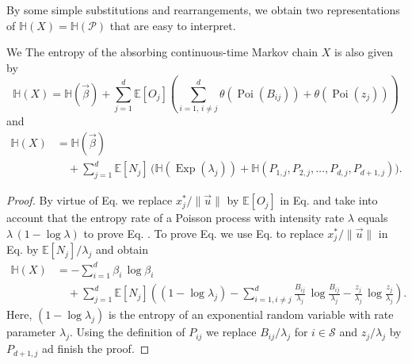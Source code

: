 \documentclass[smallextended]{svjour3}
\makeatletter
\renewcommand*{\eqref}[1]{%
  \hyperref[{#1}]{\textup{\tagform@{\ref*{#1}}}}%
}
\newcommand{\E}{\mathbb{E}}
\renewcommand{\H}{\mathbb{H}}
\newcommand{\Exp}{\operatorname{Exp}}
\newcommand{\Poi}{\operatorname{Poi}}
\newcommand{\suml}{\sum\limits}
\newcommand{\vnorms}[1]{\|#1\|}
\makeatother
\begin{document}
By some simple substitutions and rearrangements, we obtain two representations of $\H(X)=\H(\mathcal{P})$ that are easy to interpret.

\begin{proposition}\label{prop:entropy_of_X}
	We
	The entropy of the absorbing continuous-time Markov chain $X$ is also given by
	\begin{equation}
	  \label{eqn:H_occupation_time}
	  \H(X) = \H(\vec{\beta}) + \suml_{j=1}^d \E\left[O_j\right] \left(\suml_{i=1,\,i\neq j}^d \theta(\Poi(B_{ij})) + \theta(\Poi(z_j))\right)
	\end{equation}
	and
	\begin{equation}
	  \label{eqn:H_number_of_visits}
	  \begin{aligned}
      \H(X)& = \H(\vec{\beta})\\
      &\quad + \suml_{j=1}^d \E\left[N_j\right]\, \bigg(\H(\Exp(\lambda_j)) + \H(P_{1,j}, P_{2, j},\ldots,P_{d, j}, P_{d+1,j})\bigg).
    \end{aligned}
  \end{equation}
\end{proposition}

\begin{proof}
  By virtue of Eq. \eqref{eqn:H_occupation_time} we replace $x^\ast_j/\vnorms{\vec{u}}$ by $\E\left[O_j\right]$ in Eq. \eqref{eqn:H_X} and take into account that the entropy rate of a Poisson process with intensity rate $\lambda$ equals $\lambda\,(1-\log \lambda)$ to prove Eq. \eqref{eqn:H_occupation_time}.
  To prove Eq. \eqref{eqn:H_number_of_visits} we use Eq. \eqref{eqn:N_i} to replace $x^\ast_j/\vnorms{\vec{u}}$ in Eq. \eqref{eqn:H_X} by $\E\left[N_j\right]/\lambda_j$ and obtain
  \begin{equation*}
    \begin{aligned}
      \H(X) &= -\suml_{i=1}^d\beta_i\,\log\beta_i\\
      &\quad + \suml_{j=1}^d \E\left[N_j\right]\left((1-\log \lambda_j) - \suml_{i=1,i\neq j}^d \frac{B_{ij}}{\lambda_j}\,\log \frac{B_{ij}}{\lambda_j} - \frac{z_j}{\lambda_j}\,\log \frac{z_j}{\lambda_j}\right).
    \end{aligned}
	\end{equation*}
	Here, $(1-\log \lambda_j)$ is the entropy of an exponential random variable with rate parameter $\lambda_j$.
	Using the definition \eqref{eqn:P_ij} of $P_{ij}$ we replace $B_{ij}/\lambda_j$ for $i\in\mathcal{S}$ and $z_j/\lambda_j$ by $P_{d+1,j}$ ad finish the proof.
\end{proof}
\end{document}
